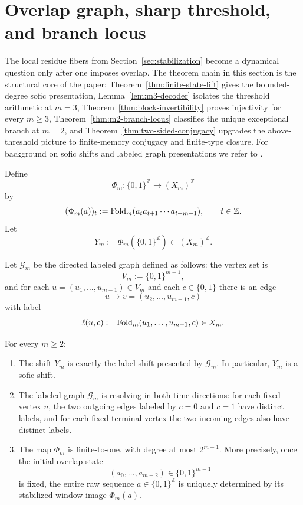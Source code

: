 \section{Overlap graph, sharp threshold, and branch locus}\label{sec:stab:conjugacy}

The local residue fibers from Section~\ref{sec:stabilization} become a dynamical question only after one imposes overlap. The theorem chain in this section is the structural core of the paper: Theorem~\ref{thm:finite-state-lift} gives the bounded-degree sofic presentation, Lemma~\ref{lem:m3-decoder} isolates the threshold arithmetic at $m=3$, Theorem~\ref{thm:block-invertibility} proves injectivity for every $m\ge 3$, Theorem~\ref{thm:m2-branch-locus} classifies the unique exceptional branch at $m=2$, and Theorem~\ref{thm:two-sided-conjugacy} upgrades the above-threshold picture to finite-memory conjugacy and finite-type closure. For background on sofic shifts and labeled graph presentations we refer to \cite{LindMarcus1995,Kitchens1998,Nasu1995}.

\begin{definition}\label{def:Phi}
Define
\[
\Phi_m:\{0,1\}^{\mathbb Z}\longrightarrow (X_m)^{\mathbb Z}
\]
by
\[
(\Phi_m(a))_t:=\mathrm{Fold}_m(a_ta_{t+1}\cdots a_{t+m-1}),\qquad t\in\mathbb Z.
\]
Let
\[
Y_m:=\Phi_m(\{0,1\}^{\mathbb Z})\subset (X_m)^{\mathbb Z}.
\]
\end{definition}

\begin{definition}
Let $\mathcal G_m$ be the directed labeled graph defined as follows: the vertex set is
\[
V_m:=\{0,1\}^{m-1},
\]
and for each $u=(u_1,\dots,u_{m-1})\in V_m$ and each $c\in\{0,1\}$ there is an edge
\[
u \longrightarrow v=(u_2,\dots,u_{m-1},c)
\]
with label
\[
\ell(u,c):=\mathrm{Fold}_m(u_1,\dots,u_{m-1},c)\in X_m.
\]
\end{definition}

\begin{theorem}\label{thm:finite-state-lift}
For every $m\ge 2$:
\begin{enumerate}[label=(\roman*),leftmargin=*,itemsep=2pt]
  \item The shift $Y_m$ is exactly the label shift presented by $\mathcal G_m$. In particular, $Y_m$ is a sofic shift.
  \item The labeled graph $\mathcal G_m$ is resolving in both time directions: for each fixed vertex $u$, the two outgoing edges labeled by $c=0$ and $c=1$ have distinct labels, and for each fixed terminal vertex the two incoming edges also have distinct labels.
  \item The map $\Phi_m$ is finite-to-one, with degree at most $2^{m-1}$. More precisely, once the initial overlap state
  \[
  (a_0,\dots,a_{m-2})\in\{0,1\}^{m-1}
  \]
  is fixed, the entire raw sequence $a\in\{0,1\}^{\mathbb Z}$ is uniquely determined by its stabilized-window image $\Phi_m(a)$.
\end{enumerate}
\end{theorem}

